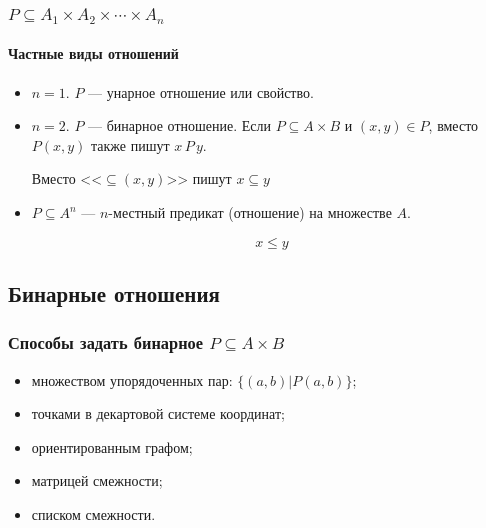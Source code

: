 \begin{frame}
    \frametitle{$P\subseteq A_1\times A_2\times \cdots\times A_n$}
    \framesubtitle{Частные виды отношений}
    
    \begin{itemize}
        \item $n=1$. $P$ --- \alert{унарное} отношение или \alert{свойство}. 
        
        \item $n=2$. $P$ --- \alert{бинарное} отношение. Если $P\subseteq A\times B$ и $(x,y)\in P$, вместо $P(x,y)$ также пишут $x\,P\,y$.
        \begin{example}
            Вместо <<$\subseteq(x, y)$>> пишут $x \subseteq y$
        \end{example}
        
        \item $P\subseteq A^n$ --- $n$-местный предикат (отношение) \alert{на множестве} $A$. 
        \begin{example}
            \[x \leq y\]
        \end{example}
    \end{itemize}
\end{frame}

\subsection{Бинарные отношения}

\begin{frame}
    \frametitle{Способы задать бинарное $P\subseteq A\times B$}
    
    \begin{itemize}
        \item множеством упорядоченных пар: $\{(a,b)|P(a,b)\}$;
        \item точками в декартовой системе координат;
        \item ориентированным графом;
        \item матрицей смежности;
        \item списком смежности. 
    \end{itemize}
\end{frame}

